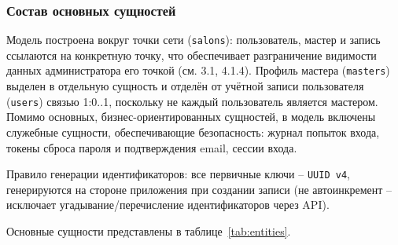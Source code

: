 \subsubsection{Состав основных сущностей}

Модель построена вокруг точки сети (\texttt{salons}): пользователь, мастер и запись ссылаются на конкретную точку, что обеспечивает разграничение видимости данных администратора его точкой (см. 3.1, 4.1.4). Профиль мастера (\texttt{masters}) выделен в отдельную сущность и отделён от учётной записи пользователя (\texttt{users}) связью 1:0..1, поскольку не каждый пользователь является мастером. Помимо основных, бизнес-ориентированных сущностей, в модель включены служебные сущности, обеспечивающие безопасность: журнал попыток входа, токены сброса пароля и подтверждения email, сессии входа.

Правило генерации идентификаторов: все первичные ключи -- \texttt{UUID v4}, генерируются на стороне приложения при создании записи (не автоинкремент -- исключает угадывание/перечисление идентификаторов через API).

Основные сущности представлены в таблице~\ref{tab:entities}.

